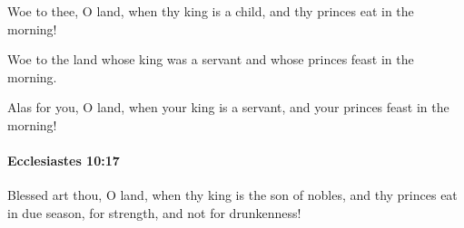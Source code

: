 			\begin{versebox}
					\item[BHS] 
					\item[LXX] 
					\item[ASV] Woe to thee, O land, when thy king is a child, and thy princes eat in the morning!
					\item[NIV] Woe to the land whose king was a servant and whose princes feast in the morning.
					\item[NRSV] Alas for you, O land, when your king is a servant, and your princes feast in the morning!
			\end{versebox}

		\paragraph{Ecclesiastes 10:17} %
			\label{ECCLESIASTES-10-17}

			Blessed art thou, O land, when thy king is the son of nobles, and thy princes eat in due season, for strength, and not for drunkenness!

